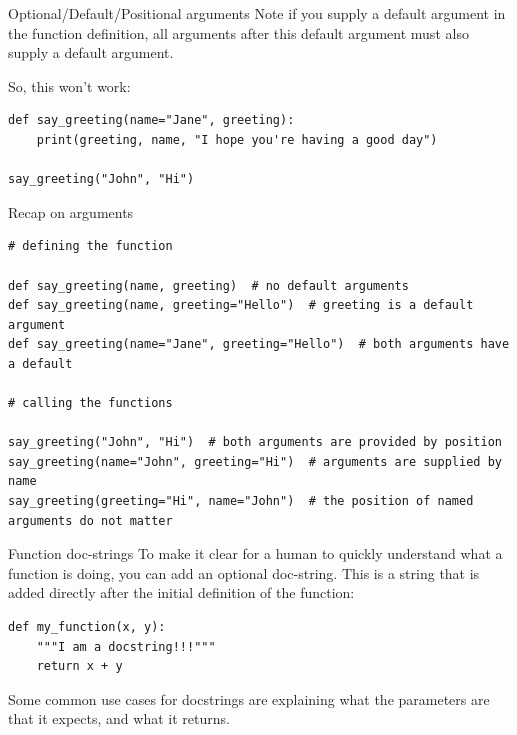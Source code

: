 \documentclass[10pt]{beamer}
\begin{document}
\begin{frame}[label={sec:orgb4b7f2f},fragile]{Optional/Default/Positional arguments}
 \alert{Note} if you supply a default argument in the function definition, all arguments after
this default argument must also supply a default argument.

So, this \alert{won't} work:

\begin{verbatim}
def say_greeting(name="Jane", greeting):
    print(greeting, name, "I hope you're having a good day")

say_greeting("John", "Hi")
\end{verbatim}
\end{frame}


\begin{frame}[label={sec:org7adfb35},fragile]{Recap on arguments}
 \begin{verbatim}
# defining the function

def say_greeting(name, greeting)  # no default arguments
def say_greeting(name, greeting="Hello")  # greeting is a default argument
def say_greeting(name="Jane", greeting="Hello")  # both arguments have a default

# calling the functions

say_greeting("John", "Hi")  # both arguments are provided by position
say_greeting(name="John", greeting="Hi")  # arguments are supplied by name
say_greeting(greeting="Hi", name="John")  # the position of named arguments do not matter
\end{verbatim}
\end{frame}


\begin{frame}[label={sec:orgd7cbb5b},fragile]{Function doc-strings}
 To make it clear for a human to quickly understand what a function is doing, you can
add an optional doc-string. This is a string that is added directly after the initial
definition of the function:

\begin{verbatim}
def my_function(x, y):
    """I am a docstring!!!"""
    return x + y
\end{verbatim}

Some common use cases for docstrings are explaining what the parameters are that it
expects, and what it returns.
\end{frame}
\end{document}
